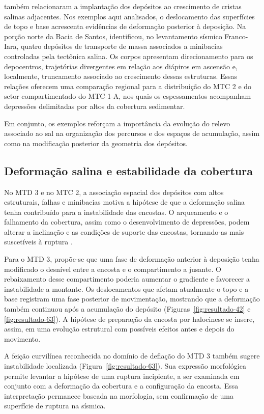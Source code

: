  também relacionaram a implantação dos depósitos ao crescimento de cristas salinas adjacentes. Nos exemplos aqui analisados, o deslocamento das superfícies de topo e base acrescenta evidências de deformação posterior à deposição. Na porção norte da Bacia de Santos,  identificou, no levantamento sísmico Franco-Iara, quatro depósitos de transporte de massa associados a minibacias controladas pela tectônica salina. Os corpos apresentam direcionamento para os depocentros, trajetórias divergentes em relação aos diápiros em ascensão e, localmente, truncamento associado ao crescimento dessas estruturas. Essas relações oferecem uma comparação regional para a distribuição do MTC 2 e do setor compartimentado do MTC 1-A, nos quais os espessamentos acompanham depressões delimitadas por altos da cobertura sedimentar.

Em conjunto, os exemplos reforçam a importância da evolução do relevo associado ao sal na organização dos percursos e dos espaços de acumulação, assim como na modificação posterior da geometria dos depósitos.

\subsection{Deformação salina e estabilidade da cobertura}\label{sec:6-2-4}

No MTD 3 e no MTC 2, a associação espacial dos depósitos com altos estruturais, falhas e minibacias motiva a hipótese de que a deformação salina tenha contribuído para a instabilidade das encostas. O arqueamento e o falhamento da cobertura, assim como o desenvolvimento de depressões, podem alterar a inclinação e as condições de suporte das encostas, tornando-as mais suscetíveis à ruptura \cite{kowsmann2002,lee2007}.

Para o MTD 3, propõe-se que uma fase de deformação anterior à deposição tenha modificado o desnível entre a encosta e o compartimento a jusante. O rebaixamento desse compartimento poderia aumentar o gradiente e favorecer a instabilidade a montante. Os deslocamentos que afetam atualmente o topo e a base registram uma fase posterior de movimentação, mostrando que a deformação também continuou após a acumulação do depósito (Figuras~\ref{fig:resultado-42} e \ref{fig:resultado-63}). A hipótese de preparação da encosta por halocinese se insere, assim, em uma evolução estrutural com possíveis efeitos antes e depois do movimento.

A feição curvilínea reconhecida no domínio de deflação do MTD 3 também sugere instabilidade localizada (Figura~\ref{fig:resultado-63}). Sua expressão morfológica permite levantar a hipótese de uma ruptura incipiente, a ser examinada em conjunto com a deformação da cobertura e a configuração da encosta. Essa interpretação permanece baseada na morfologia, sem confirmação de uma superfície de ruptura na sísmica.

